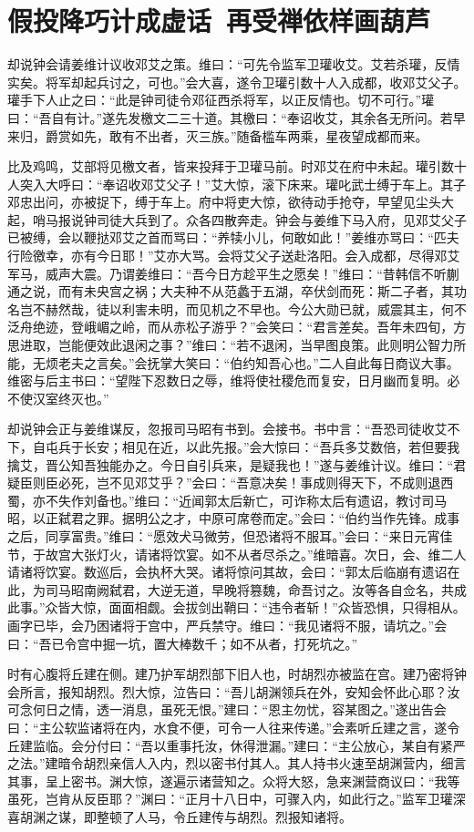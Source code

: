 \chapter{假投降巧计成虚话~再受禅依样画葫芦}

却说钟会请姜维计议收邓艾之策。维曰：“可先令监军卫瓘收艾。艾若杀瓘，反情实矣。将军却起兵讨之，可也。”会大喜，遂令卫瓘引数十人入成都，收邓艾父子。瓘手下人止之曰：“此是钟司徒令邓征西杀将军，以正反情也。切不可行。”瓘曰：“吾自有计。”遂先发檄文二三十道。其檄曰：“奉诏收艾，其余各无所问。若早来归，爵赏如先，敢有不出者，灭三族。”随备槛车两乘，星夜望成都而来。

比及鸡鸣，艾部将见檄文者，皆来投拜于卫瓘马前。时邓艾在府中未起。瓘引数十人突入大呼曰：“奉诏收邓艾父子！”艾大惊，滚下床来。瓘叱武士缚于车上。其子邓忠出问，亦被捉下，缚于车上。府中将吏大惊，欲待动手抢夺，早望见尘头大起，哨马报说钟司徒大兵到了。众各四散奔走。钟会与姜维下马入府，见邓艾父子已被缚，会以鞭挞邓艾之首而骂曰：“养犊小儿，何敢如此！”姜维亦骂曰：“匹夫行险徼幸，亦有今日耶！”艾亦大骂。会将艾父子送赴洛阳。会入成都，尽得邓艾军马，威声大震。乃谓姜维曰：“吾今日方趁平生之愿矣！”维曰：“昔韩信不听蒯通之说，而有未央宫之祸；大夫种不从范蠡于五湖，卒伏剑而死：斯二子者，其功名岂不赫然哉，徒以利害未明，而见机之不早也。今公大勋已就，威震其主，何不泛舟绝迹，登峨嵋之岭，而从赤松子游乎？”会笑曰：“君言差矣。吾年未四旬，方思进取，岂能便效此退闲之事？”维曰：“若不退闲，当早图良策。此则明公智力所能，无烦老夫之言矣。”会抚掌大笑曰：“伯约知吾心也。”二人自此每日商议大事。维密与后主书曰：“望陛下忍数日之辱，维将使社稷危而复安，日月幽而复明。必不使汉室终灭也。”

却说钟会正与姜维谋反，忽报司马昭有书到。会接书。书中言：“吾恐司徒收艾不下，自屯兵于长安；相见在近，以此先报。”会大惊曰：“吾兵多艾数倍，若但要我擒艾，晋公知吾独能办之。今日自引兵来，是疑我也！”遂与姜维计议。维曰：“君疑臣则臣必死，岂不见邓艾乎？”会曰：“吾意决矣！事成则得天下，不成则退西蜀，亦不失作刘备也。”维曰：“近闻郭太后新亡，可诈称太后有遗诏，教讨司马昭，以正弑君之罪。据明公之才，中原可席卷而定。”会曰：“伯约当作先锋。成事之后，同享富贵。”维曰：“愿效犬马微劳，但恐诸将不服耳。”会曰：“来日元宵佳节，于故宫大张灯火，请诸将饮宴。如不从者尽杀之。”维暗喜。次日，会、维二人请诸将饮宴。数巡后，会执杯大哭。诸将惊问其故，会曰：“郭太后临崩有遗诏在此，为司马昭南阙弑君，大逆无道，早晚将篡魏，命吾讨之。汝等各自佥名，共成此事。”众皆大惊，面面相觑。会拔剑出鞘曰：“违令者斩！”众皆恐惧，只得相从。画字已毕，会乃困诸将于宫中，严兵禁守。维曰：“我见诸将不服，请坑之。”会曰：“吾已令宫中掘一坑，置大棒数千；如不从者，打死坑之。”

时有心腹将丘建在侧。建乃护军胡烈部下旧人也，时胡烈亦被监在宫。建乃密将钟会所言，报知胡烈。烈大惊，泣告曰：“吾儿胡渊领兵在外，安知会怀此心耶？汝可念何日之情，透一消息，虽死无恨。”建曰：“恩主勿忧，容某图之。”遂出告会曰：“主公软监诸将在内，水食不便，可令一人往来传递。”会素听丘建之言，遂令丘建监临。会分付曰：“吾以重事托汝，休得泄漏。”建曰：“主公放心，某自有紧严之法。”建暗令胡烈亲信人入内，烈以密书付其人。其人持书火速至胡渊营内，细言其事，呈上密书。渊大惊，遂遍示诸营知之。众将大怒，急来渊营商议曰：“我等虽死，岂肯从反臣耶？”渊曰：“正月十八日中，可骤入内，如此行之。”监军卫瓘深喜胡渊之谋，即整顿了人马，令丘建传与胡烈。烈报知诸将。

